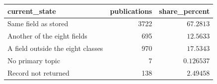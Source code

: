 \begin{tabular}{lrr}
\toprule
current\_state & publications & share\_percent \\
\midrule
Same field as stored & 3722 & $67.2813$ \\
Another of the eight fields & 695 & $12.5633$ \\
A field outside the eight classes & 970 & $17.5343$ \\
No primary topic & 7 & $0.126537$ \\
Record not returned & 138 & $2.49458$ \\
\bottomrule
\end{tabular}
